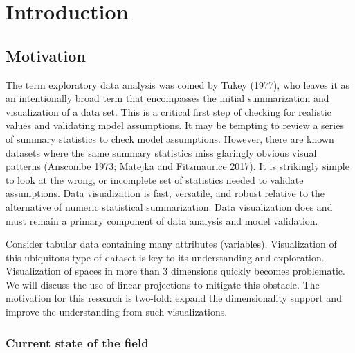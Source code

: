 \documentclass[
  11,
]{article}
\begin{document}
\newpage

% 

\doublespacing

\newpage
{}
\hypersetup{linkcolor = blue}

{
\hypersetup{linkcolor=}
\setcounter{tocdepth}{2}
\tableofcontents
}
\hypertarget{sec:intro}{%
\section{Introduction}\label{sec:intro}}

\hypertarget{motivation}{%
\subsection{Motivation}\label{motivation}}

The term exploratory data analysis was coined by Tukey (1977), who leaves it as an intentionally broad term that encompasses the initial summarization and visualization of a data set. This is a critical first step of checking for realistic values and validating model assumptions. It may be tempting to review a series of summary statistics to check model assumptions. However, there are known datasets where the same summary statistics miss glaringly obvious visual patterns (Anscombe 1973; Matejka and Fitzmaurice 2017). It is strikingly simple to look at the wrong, or incomplete set of statistics needed to validate assumptions. Data visualization is fast, versatile, and robust relative to the alternative of numeric statistical summarization. Data visualization does and must remain a primary component of data analysis and model validation.

Consider tabular data containing many attributes (variables). Visualization of this ubiquitous type of dataset is key to its understanding and exploration. Visualization of spaces in more than 3 dimensions quickly becomes problematic. We will discuss the use of linear projections to mitigate this obstacle. The motivation for this research is two-fold: expand the dimensionality support and improve the understanding from such visualizations.

\hypertarget{current-state-of-the-field}{%
\subsubsection{Current state of the field}\label{current-state-of-the-field}}
\end{document}
